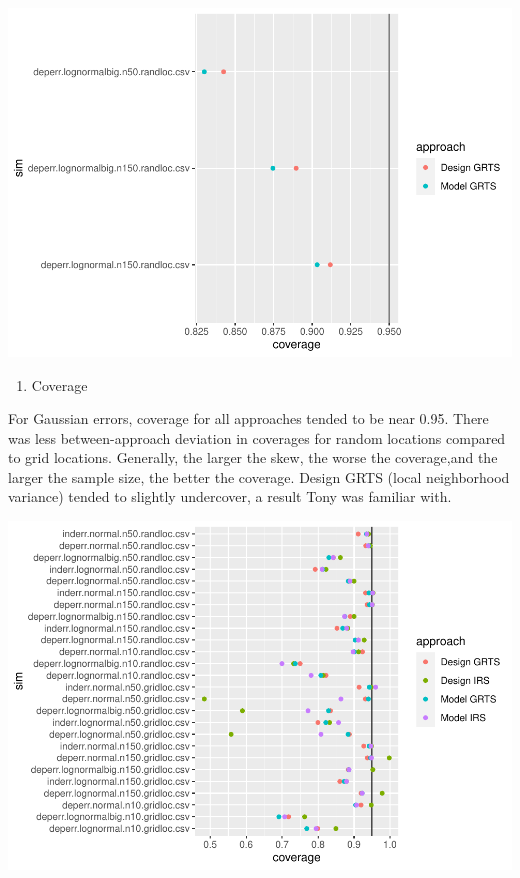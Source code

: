 \documentclass[]{elsarticle} %
\providecommand{\tightlist}{%
  \setlength{\itemsep}{0pt}\setlength{\parskip}{0pt}}
\begin{document}
\includegraphics{SpatialDVM_Manuscript_files/figure-latex/unnamed-chunk-5-1.pdf}

\begin{enumerate}
\def\labelenumi{\arabic{enumi}.}
\setcounter{enumi}{3}
\tightlist
\item
  Coverage
\end{enumerate}

For Gaussian errors, coverage for all approaches tended to be near 0.95.
There was less between-approach deviation in coverages for random
locations compared to grid locations. Generally, the larger the skew,
the worse the coverage,and the larger the sample size, the better the
coverage. Design GRTS (local neighborhood variance) tended to slightly
undercover, a result Tony was familiar with.

\includegraphics{SpatialDVM_Manuscript_files/figure-latex/unnamed-chunk-6-1.pdf}
\end{document}
